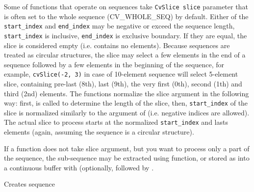Some of functions that operate on sequences take \texttt{CvSlice slice}
parameter that is often set to the whole sequence (CV\_WHOLE\_SEQ) by
default. Either of the \texttt{start\_index} and \texttt{end\_index}
may be negative or exceed the sequence length, \texttt{start\_index} is
inclusive, \texttt{end\_index} is exclusive boundary. If they are equal,
the slice is considered empty (i.e. contains no elements). Because
sequences are treated as circular structures, the slice may select a
few elements in the end of a sequence followed by a few elements in the
beginning of the sequence, for example, \texttt{cvSlice(-2, 3)} in case of
10-element sequence will select 5-element slice, containing pre-last
(8th), last (9th), the very first (0th), second (1th) and third (2nd)
elements. The functions normalize the slice argument in the following way:
first,  is called to determine the length of the slice,
then, \texttt{start\_index} of the slice is normalized similarly to the
argument of  (i.e. negative indices are allowed). The
actual slice to process starts at the normalized \texttt{start\_index}
and lasts  elements (again, assuming the sequence is
a circular structure).

If a function does not take slice argument, but you want to process
only a part of the sequence, the sub-sequence may be extracted
using  function, or stored as into a continuous
buffer with  (optionally, followed by
.

\label{CreateSeq}

Creates sequence


\begin{description}
\end{description}

